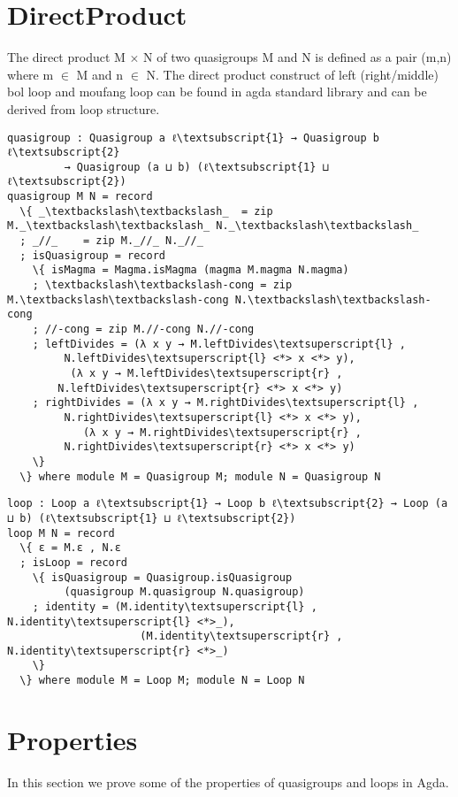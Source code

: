 \section{DirectProduct}
The direct product M \(\times\) N of two quasigroups M and N is defined as a pair (m,n) where m \(\in\) M and n \(\in\) N. The direct product construct of left (right/middle) bol loop and moufang loop can be found in agda standard library and can be derived from loop structure.
\begin{Verbatim}[commandchars=\\\{\},samepage=true]
quasigroup : Quasigroup a ℓ\textsubscript{1} → Quasigroup b ℓ\textsubscript{2}
		 → Quasigroup (a ⊔ b) (ℓ\textsubscript{1} ⊔ ℓ\textsubscript{2})
quasigroup M N = record
  \{ _\textbackslash\textbackslash_  = zip M._\textbackslash\textbackslash_ N._\textbackslash\textbackslash_
  ; _//_    = zip M._//_ N._//_
  ; isQuasigroup = record
    \{ isMagma = Magma.isMagma (magma M.magma N.magma)
    ; \textbackslash\textbackslash-cong = zip M.\textbackslash\textbackslash-cong N.\textbackslash\textbackslash-cong
    ; //-cong = zip M.//-cong N.//-cong
    ; leftDivides = (λ x y → M.leftDivides\textsuperscript{l} ,
		 N.leftDivides\textsuperscript{l} <*> x <*> y),
		  (λ x y → M.leftDivides\textsuperscript{r} , 
		N.leftDivides\textsuperscript{r} <*> x <*> y)
    ; rightDivides = (λ x y → M.rightDivides\textsuperscript{l} ,
		 N.rightDivides\textsuperscript{l} <*> x <*> y), 
		    (λ x y → M.rightDivides\textsuperscript{r} ,
		 N.rightDivides\textsuperscript{r} <*> x <*> y)
    \}
  \} where module M = Quasigroup M; module N = Quasigroup N
\end{Verbatim}
\begin{Verbatim}[commandchars=\\\{\},samepage=true]
loop : Loop a ℓ\textsubscript{1} → Loop b ℓ\textsubscript{2} → Loop (a ⊔ b) (ℓ\textsubscript{1} ⊔ ℓ\textsubscript{2})
loop M N = record
  \{ ε = M.ε , N.ε
  ; isLoop = record
    \{ isQuasigroup = Quasigroup.isQuasigroup
		 (quasigroup M.quasigroup N.quasigroup)
    ; identity = (M.identity\textsuperscript{l} , N.identity\textsuperscript{l} <*>_),
                     (M.identity\textsuperscript{r} , N.identity\textsuperscript{r} <*>_)
    \}
  \} where module M = Loop M; module N = Loop N
\end{Verbatim}

\section{Properties}
In this section we prove some of the properties of quasigroups and loops in Agda.
